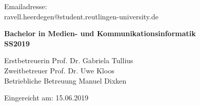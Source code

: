 \begin{titlepage}
\begin{center}
\vspace*{0.4cm}

Emailadresse:\\
ravell.heerdegen@student.reutlingen-university.de\\

\vspace*{0.6cm}

\textbf{Bachelor in Medien- und Kommunikationsinformatik}\\
\textbf{SS2019\\}

\vspace*{0.8cm}

Erstbetreuerin Prof. Dr. Gabriela Tullius\\
Zweitbetreuer Prof. Dr. Uwe Kloos\\
Betriebliche Betreuung Manuel Dixken\\

\vspace*{1.6cm}

Eingereicht am:	15.06.2019



\end{center}

\end{titlepage}